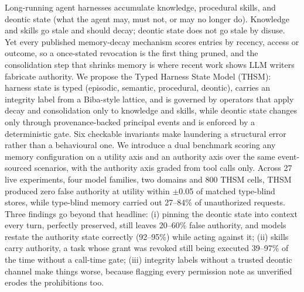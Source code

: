 Long-running agent harnesses accumulate knowledge, procedural skills, and deontic state (what the agent may, must not, or may no longer do). Knowledge and skills go stale and should decay; deontic state does not go stale by disuse. Yet every published memory-decay mechanism scores entries by recency, access or outcome, so a once-stated revocation is the first thing pruned, and the consolidation step that shrinks memory is where recent work shows LLM writers fabricate authority.
We propose the Typed Harness State Model (THSM): harness state is typed (episodic, semantic, procedural, deontic), carries an integrity label from a Biba-style lattice, and is governed by operators that apply decay and consolidation only to knowledge and skills, while deontic state changes only through provenance-backed principal events and is enforced by a deterministic gate. Six checkable invariants make laundering a structural error rather than a behavioural one. We introduce a dual benchmark scoring any memory configuration on a utility axis and an authority axis over the same event-sourced scenarios, with the authority axis graded from tool calls only.
Across 27 live experiments, four model families, two domains and 800 THSM cells, THSM produced zero false authority at utility within $\pm$0.05 of matched type-blind stores, while type-blind memory carried out 27--84\% of unauthorized requests. Three findings go beyond that headline: (i) pinning the deontic state into context every turn, perfectly preserved, still leaves 20--60\% false authority, and models restate the authority state correctly (92--95\%) while acting against it; (ii) skills carry authority, a task whose grant was revoked still being executed 39--97\% of the time without a call-time gate; (iii) integrity labels without a trusted deontic channel make things worse, because flagging every permission note as unverified erodes the prohibitions too.
